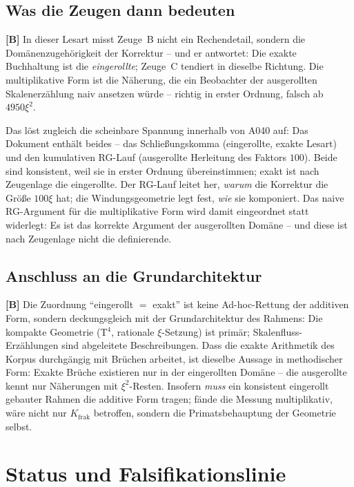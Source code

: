 \subsection{Was die Zeugen dann bedeuten}

\textbf{[B]} In dieser Lesart misst Zeuge~B nicht ein
Rechendetail, sondern die Dom\"anenzugeh\"origkeit der Korrektur -- und
er antwortet: Die exakte Buchhaltung ist die
\emph{eingerollte}; Zeuge~C tendiert in dieselbe Richtung. Die multiplikative Form ist die N\"aherung, die ein
Beobachter der ausgerollten Skalenerz\"ahlung naiv ansetzen w\"urde --
richtig in erster Ordnung, falsch ab $4950\xi^2$.

Das l\"ost zugleich die scheinbare Spannung innerhalb von A040 auf: Das
Dokument enth\"alt beides -- das Schlie\ss ungskomma (eingerollte, exakte
Lesart) und den kumulativen RG-Lauf (ausgerollte Herleitung des Faktors
$100$). Beide sind konsistent, weil sie in erster Ordnung
\"ubereinstimmen; exakt ist nach Zeugenlage die eingerollte. Der RG-Lauf
leitet her, \emph{warum} die Korrektur die Gr\"o\ss e $100\xi$ hat; die
Windungsgeometrie legt fest, \emph{wie} sie komponiert. Das naive
RG-Argument f\"ur die multiplikative Form wird damit eingeordnet statt
widerlegt: Es ist das korrekte Argument der ausgerollten Dom\"ane -- und
diese ist nach Zeugenlage nicht die definierende.

\subsection{Anschluss an die Grundarchitektur}

\textbf{[B]} Die Zuordnung \enquote{eingerollt $=$ exakt} ist keine
Ad-hoc-Rettung der additiven Form, sondern deckungsgleich mit der
Grundarchitektur des Rahmens: Die kompakte Geometrie (T$^4$, rationale
$\xi$-Setzung) ist prim\"ar; Skalenfluss-Erz\"ahlungen sind abgeleitete
Beschreibungen. Dass die exakte Arithmetik des Korpus durchg\"angig mit
Br\"uchen arbeitet, ist dieselbe Aussage in methodischer Form: Exakte
Br\"uche existieren nur in der eingerollten Dom\"ane -- die ausgerollte
kennt nur N\"aherungen mit $\xi^2$-Resten. Insofern \emph{muss} ein
konsistent eingerollt gebauter Rahmen die additive Form tragen; f\"ande
die Messung multiplikativ, w\"are nicht nur $K_\text{frak}$ betroffen,
sondern die Primatsbehauptung der Geometrie selbst.

\section{Status und Falsifikationslinie}

